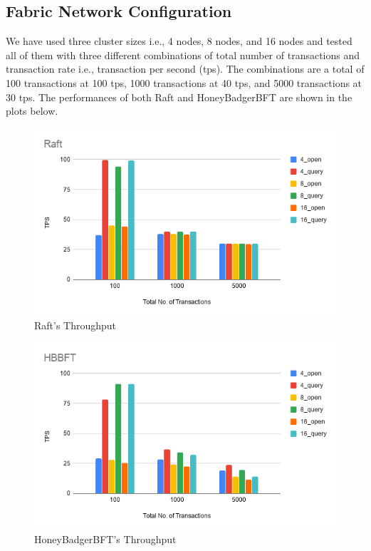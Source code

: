 \subsection{Fabric Network Configuration}
We have used three cluster sizes i.e., 4 nodes, 8 nodes, and 16 nodes and tested all of them with three different combinations of total number of transactions and transaction rate i.e., transaction per second (tps). The combinations are a total of 100 transactions at 100 tps, 1000 transactions at 40 tps, and 5000 transactions at 30 tps. The performances of both Raft and HoneyBadgerBFT are shown in the plots below.
\begin{figure}[!h]
    \centering
    \includegraphics[scale=0.7]{images/raft_tps.png}
    \caption{Raft's Throughput}
    \label{fig:raft_tps}
\end{figure}
\begin{figure}[!h]
    \centering
    \includegraphics[scale=0.7]{images/hbbft_tps.png}
    \caption{HoneyBadgerBFT's Throughput}
    \label{fig:hbbft_tps}
\end{figure}
  
